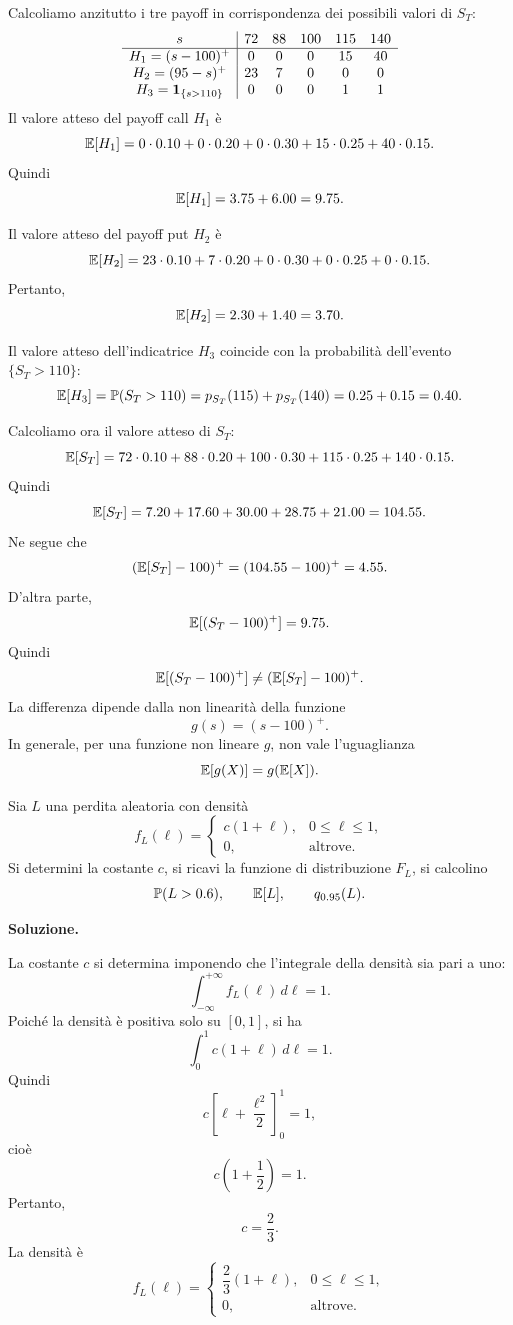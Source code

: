 Calcoliamo anzitutto i tre payoff in corrispondenza dei possibili valori di
$S_T$:
\[
\begin{array}{c|ccccc}
s & 72 & 88 & 100 & 115 & 140\\
\hline
H_1=(s-100)^+ & 0 & 0 & 0 & 15 & 40\\
H_2=(95-s)^+ & 23 & 7 & 0 & 0 & 0\\
H_3=\mathbf{1}_{\{s>110\}} & 0 & 0 & 0 & 1 & 1
\end{array}
\]
Il valore atteso del payoff call $H_1$ \`{e}
\[
\mathbb{E}[H_1]
=
0\cdot 0.10+0\cdot 0.20+0\cdot 0.30
+15\cdot 0.25+40\cdot 0.15.
\]
Quindi
\[
\mathbb{E}[H_1]
=
3.75+6.00
=
9.75.
\]

Il valore atteso del payoff put $H_2$ \`{e}
\[
\mathbb{E}[H_2]
=
23\cdot 0.10+7\cdot 0.20
+
0\cdot 0.30+0\cdot 0.25+0\cdot 0.15.
\]
Pertanto,
\[
\mathbb{E}[H_2]
=
2.30+1.40
=
3.70.
\]

Il valore atteso dell'indicatrice $H_3$ coincide con la probabilit\`{a}
dell'evento $\{S_T>110\}$:
\[
\mathbb{E}[H_3]
=
\mathbb{P}(S_T>110)
=
p_{S_T}(115)+p_{S_T}(140)
=
0.25+0.15
=
0.40.
\]

Calcoliamo ora il valore atteso di $S_T$:
\[
\mathbb{E}[S_T]
=
72\cdot 0.10+88\cdot 0.20+100\cdot 0.30
+115\cdot 0.25+140\cdot 0.15.
\]
Quindi
\[
\mathbb{E}[S_T]
=
7.20+17.60+30.00+28.75+21.00
=
104.55.
\]
Ne segue che
\[
(\mathbb{E}[S_T]-100)^+
=
(104.55-100)^+
=
4.55.
\]
D'altra parte,
\[
\mathbb{E}[(S_T-100)^+]=9.75.
\]
Quindi
\[
\mathbb{E}[(S_T-100)^+]\neq (\mathbb{E}[S_T]-100)^+.
\]
La differenza dipende dalla non linearit\`{a} della funzione
\[
g(s)=(s-100)^+.
\]
In generale, per una funzione non lineare $g$, non vale l'uguaglianza
\[
\mathbb{E}[g(X)]=g(\mathbb{E}[X]).
\]

\begin{exercise}
\label{ex:cap2-densita-cdf-quantile}
\par\smallskip

Sia $L$ una perdita aleatoria con densit\`{a}
\[
f_L(\ell)=
\begin{cases}
c(1+\ell), & 0\leq \ell\leq 1,\\
0, & \mbox{altrove}.
\end{cases}
\]
Si determini la costante $c$, si ricavi la funzione di distribuzione $F_L$, si
calcolino
\[
\mathbb{P}(L>0.6),
\qquad
\mathbb{E}[L],
\qquad
q_{0.95}(L).
\]

\end{exercise}

\noindent
\textbf{Soluzione.}

La costante $c$ si determina imponendo che l'integrale della densit\`{a} sia pari
a uno:
\[
\int_{-\infty}^{+\infty}f_L(\ell)\,d\ell=1.
\]
Poich\'{e} la densit\`{a} \`{e} positiva solo su $[0,1]$, si ha
\[
\int_0^1 c(1+\ell)\,d\ell=1.
\]
Quindi
\[
c\left[\ell+\frac{\ell^2}{2}\right]_0^1=1,
\]
cio\`{e}
\[
c\left(1+\frac{1}{2}\right)=1.
\]
Pertanto,
\[
c=\frac{2}{3}.
\]
La densit\`{a} \`{e}
\[
f_L(\ell)=
\begin{cases}
\dfrac{2}{3}(1+\ell), & 0\leq \ell\leq 1,\\[6pt]
0, & \mbox{altrove}.
\end{cases}
\]

